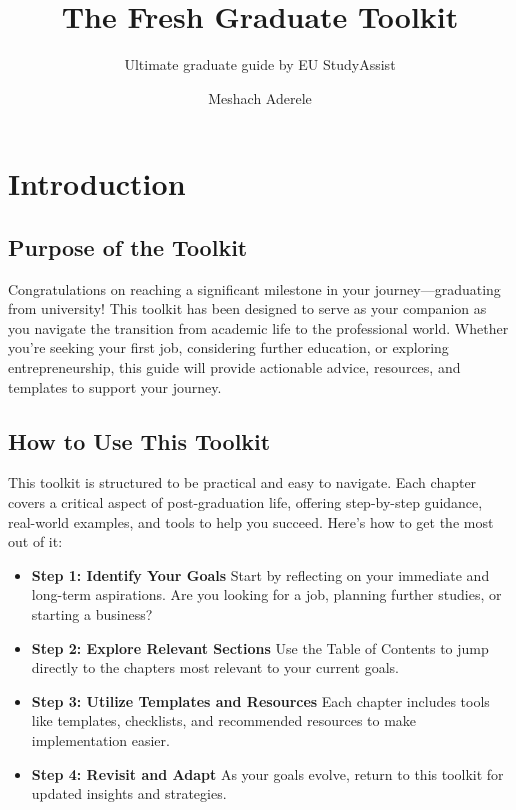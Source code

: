 \documentclass[
  letterpaper,
  DIV=11,
  numbers=noendperiod]{scrreprt}
\title{The Fresh Graduate Toolkit}
\subtitle{Ultimate graduate guide by EU StudyAssist}
\author{Meshach Aderele}
\date{}
\renewcommand*\contentsname{Table of contents}
\newcommand\contentsname{Table of contents}
\begin{document}
\maketitle

\renewcommand*\contentsname{Table of contents}
{
\hypersetup{linkcolor=}
\setcounter{tocdepth}{2}
\tableofcontents
}


\chapter*{Introduction}\label{introduction}


\section*{Purpose of the Toolkit}\label{purpose-of-the-toolkit}


Congratulations on reaching a significant milestone in your
journey---graduating from university! This toolkit has been designed to
serve as your companion as you navigate the transition from academic
life to the professional world. Whether you're seeking your first job,
considering further education, or exploring entrepreneurship, this guide
will provide actionable advice, resources, and templates to support your
journey.

\section*{How to Use This Toolkit}\label{how-to-use-this-toolkit}


This toolkit is structured to be practical and easy to navigate. Each
chapter covers a critical aspect of post-graduation life, offering
step-by-step guidance, real-world examples, and tools to help you
succeed. Here's how to get the most out of it:

\begin{itemize}
\item
  \textbf{Step 1: Identify Your Goals} Start by reflecting on your
  immediate and long-term aspirations. Are you looking for a job,
  planning further studies, or starting a business?
\item
  \textbf{Step 2: Explore Relevant Sections} Use the Table of Contents
  to jump directly to the chapters most relevant to your current goals.
\item
  \textbf{Step 3: Utilize Templates and Resources} Each chapter includes
  tools like templates, checklists, and recommended resources to make
  implementation easier.
\item
  \textbf{Step 4: Revisit and Adapt} As your goals evolve, return to
  this toolkit for updated insights and strategies.
\end{itemize}
\end{document}
